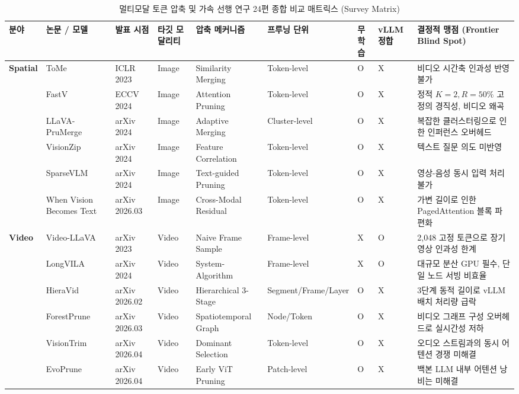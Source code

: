 \documentclass[10pt, a4paper, twocolumn]{article}
\begin{document}
\begin{table}[t]
\centering
\scriptsize
\caption{멀티모달 토큰 압축 및 가속 선행 연구 24편 종합 비교 매트릭스 (Survey Matrix)}
\label{tab:master_survey}
\begin{tabular}{p{0.9cm}p{2.1cm}p{1.3cm}p{1.5cm}p{2.2cm}p{1.6cm}p{0.6cm}p{0.9cm}p{4.2cm}}
\toprule
\textbf{분야} & \textbf{논문 / 모델} & \textbf{발표 시점} & \textbf{타깃 모달리티} & \textbf{압축 메커니즘} & \textbf{프루닝 단위} & \textbf{무학습} & \textbf{vLLM 정합} & \textbf{결정적 맹점 (Frontier Blind Spot)} \\
\midrule
\textbf{Spatial} & ToMe & ICLR 2023 & Image & Similarity Merging & Token-level & O & X & 비디오 시간축 인과성 반영 불가 \\
& FastV & ECCV 2024 & Image & Attention Pruning & Token-level & O & X & 정적 $K=2, R=50\%$ 고정의 경직성, 비디오 왜곡 \\
& LLaVA-PruMerge & arXiv 2024 & Image & Adaptive Merging & Cluster-level & O & X & 복잡한 클러스터링으로 인한 인퍼런스 오버헤드 \\
& VisionZip & arXiv 2024 & Image & Feature Correlation & Token-level & O & X & 텍스트 질문 의도 미반영 \\
& SparseVLM & arXiv 2024 & Image & Text-guided Pruning & Token-level & O & X & 영상-음성 동시 입력 처리 불가 \\
& When Vision Becomes Text & arXiv 2026.03 & Image & Cross-Modal Residual & Token-level & O & X & 가변 길이로 인한 PagedAttention 블록 파편화 \\
\midrule
\textbf{Video} & Video-LLaVA & arXiv 2023 & Video & Naive Frame Sample & Frame-level & X & O & 2,048 고정 토큰으로 장기 영상 인과성 한계 \\
& LongVILA & arXiv 2024 & Video & System-Algorithm & Frame-level & X & O & 대규모 분산 GPU 필수, 단일 노드 서빙 비효율 \\
& HieraVid & arXiv 2026.02 & Video & Hierarchical 3-Stage & Segment/Frame/Layer & O & X & 3단계 동적 길이로 vLLM 배치 처리량 급락 \\
& ForestPrune & arXiv 2026.03 & Video & Spatiotemporal Graph & Node/Token & O & X & 비디오 그래프 구성 오버헤드로 실시간성 저하 \\
& VisionTrim & arXiv 2026.04 & Video & Dominant Selection & Token-level & O & X & 오디오 스트림과의 동시 어텐션 경쟁 미해결 \\
& EvoPrune & arXiv 2026.04 & Video & Early ViT Pruning & Patch-level & O & X & 백본 LLM 내부 어텐션 낭비는 미해결 \\
\midrule

\end{tabular}
\end{table}
\end{document}
